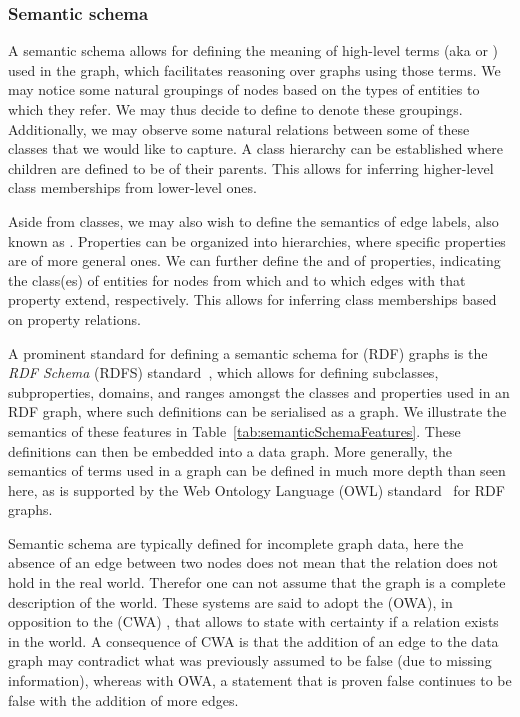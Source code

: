 \subsubsection{Semantic schema}
A semantic schema allows for defining the meaning of high-level terms (aka  or ) used in the graph, which facilitates reasoning over graphs using those terms. We may notice some natural groupings of nodes based on the types of entities to which they refer. We may thus decide to define  to denote these groupings. Additionally, we may observe some natural relations between some of these classes that we would like to capture. A class hierarchy can be established where children are defined to be  of their parents. This allows for inferring higher-level class memberships from lower-level ones.

Aside from classes, we may also wish to define the semantics of edge labels, also known as . Properties can be organized into hierarchies, where specific properties are  of more general ones. We can further define the  and  of properties, indicating the class(es) of entities for nodes from which and to which edges with that property extend, respectively. This allows for inferring class memberships based on property relations.

A prominent standard for defining a semantic schema for (RDF) graphs is the \textit{RDF Schema} (RDFS) standard~\cite{Brickley2014RDFSchema1.1}, which allows for defining subclasses, subproperties, domains, and ranges amongst the classes and properties used in an RDF graph, where such definitions can be serialised as a graph. We illustrate the semantics of these features in Table~\ref{tab:semanticSchemaFeatures}. These definitions can then be embedded into a data graph. More generally, the semantics of terms used in a graph can be defined in much more depth than seen here, as is supported by the Web Ontology Language (OWL) standard~\cite{Hitzler2014OWLPrimer} for RDF graphs.

Semantic schema are typically defined for incomplete graph data, here the absence of an edge between two nodes does not mean that the relation does not hold in the real world. Therefor one can not assume that the graph is a complete description of the world. These systems are said to adopt the  (OWA), in opposition to the  (CWA) , that allows to state with certainty if a relation exists in the world. A consequence of CWA is that the addition of an edge to the data graph may contradict what was previously assumed to be false (due to missing information), whereas with OWA, a statement that is proven false continues to be false with the addition of more edges.

